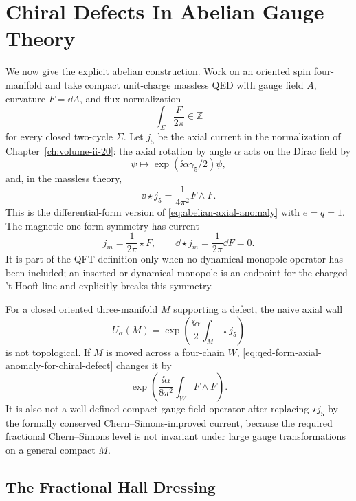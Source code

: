 \section{Chiral Defects In Abelian Gauge Theory}
\label{sec:chiral-defects-abelian-gauge-theory}

We now give the explicit abelian construction.  Work on an oriented spin
four-manifold and take compact unit-charge massless QED with gauge field
\(A\), curvature \(F=\dd A\), and flux normalization
\[
  \int_\Sigma \frac{F}{2\pi}\in\mathbb Z
\]
for every closed two-cycle \(\Sigma\).  Let \(j_5\) be the axial current in the
normalization of Chapter~\ref{ch:volume-ii-20}: the axial rotation
by angle \(\alpha\) acts on the Dirac field by
\[
  \psi\mapsto \exp(\ii\alpha\gamma_5/2)\psi ,
\]
and, in the massless theory,
\begin{equation}
  \dd\star j_5=\frac{1}{4\pi^2}F\wedge F .
  \label{eq:qed-form-axial-anomaly-for-chiral-defect}
\end{equation}
This is the differential-form version of
\eqref{eq:abelian-axial-anomaly} with \(e=q=1\).  The magnetic one-form
symmetry has current
\[
  j_m=\frac{1}{2\pi}\star F,
  \qquad
  \dd\star j_m=\frac{1}{2\pi}\dd F=0 .
\]
It is part of the QFT definition only when no dynamical monopole operator has
been included; an inserted or dynamical monopole is an endpoint for the charged
't Hooft line and explicitly breaks this symmetry.

For a closed oriented three-manifold \(M\) supporting a defect, the naive axial
wall
\[
  U_\alpha(M)
  =
  \exp\left(\frac{\ii\alpha}{2}\int_M\star j_5\right)
\]
is not topological.  If \(M\) is moved across a four-chain \(W\),
\eqref{eq:qed-form-axial-anomaly-for-chiral-defect} changes it by
\[
  \exp\left(\frac{\ii\alpha}{8\pi^2}\int_W F\wedge F\right).
\]
It is also not a well-defined compact-gauge-field operator after replacing
\(\star j_5\) by the formally conserved Chern--Simons-improved current,
because the required fractional Chern--Simons level is not invariant under
large gauge transformations on a general compact \(M\).

\subsection{The Fractional Hall Dressing}

